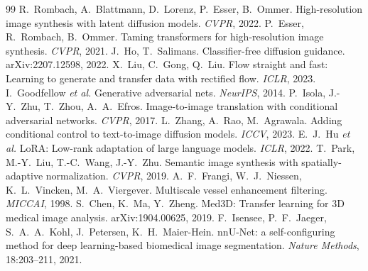 \documentclass[11pt,a4paper,oneside]{report}
\begin{document}
\begin{thebibliography}{99}
 R.~Rombach, A.~Blattmann, D.~Lorenz, P.~Esser, B.~Ommer. High-resolution image synthesis with latent diffusion models. \emph{CVPR}, 2022.
 P.~Esser, R.~Rombach, B.~Ommer. Taming transformers for high-resolution image synthesis. \emph{CVPR}, 2021.
 J.~Ho, T.~Salimans. Classifier-free diffusion guidance. arXiv:2207.12598, 2022.
 X.~Liu, C.~Gong, Q.~Liu. Flow straight and fast: Learning to generate and transfer data with rectified flow. \emph{ICLR}, 2023.
 I.~Goodfellow \emph{et al.} Generative adversarial nets. \emph{NeurIPS}, 2014.
 P.~Isola, J.-Y.~Zhu, T.~Zhou, A.~A.~Efros. Image-to-image translation with conditional adversarial networks. \emph{CVPR}, 2017.
 L.~Zhang, A.~Rao, M.~Agrawala. Adding conditional control to text-to-image diffusion models. \emph{ICCV}, 2023.
 E.~J.~Hu \emph{et al.} LoRA: Low-rank adaptation of large language models. \emph{ICLR}, 2022.
 T.~Park, M.-Y.~Liu, T.-C.~Wang, J.-Y.~Zhu. Semantic image synthesis with spatially-adaptive normalization. \emph{CVPR}, 2019.
 A.~F.~Frangi, W.~J.~Niessen, K.~L.~Vincken, M.~A.~Viergever. Multiscale vessel enhancement filtering. \emph{MICCAI}, 1998.
 S.~Chen, K.~Ma, Y.~Zheng. Med3D: Transfer learning for 3D medical image analysis. arXiv:1904.00625, 2019.
 F.~Isensee, P.~F.~Jaeger, S.~A.~A.~Kohl, J.~Petersen, K.~H.~Maier-Hein. nnU-Net: a self-configuring method for deep learning-based biomedical image segmentation. \emph{Nature Methods}, 18:203--211, 2021.
\end{thebibliography}
\end{document}
